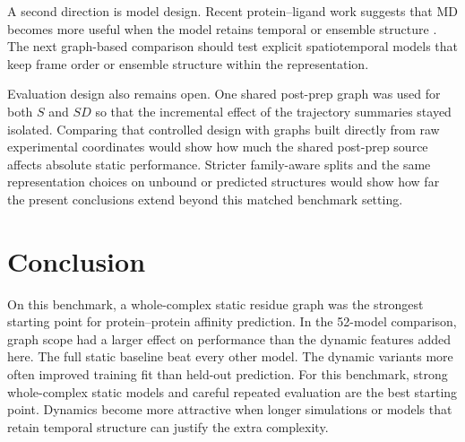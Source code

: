 A second direction is model design. Recent protein--ligand work suggests that MD becomes more useful when the model retains temporal or ensemble structure \citep{Min2024Dynaformer,Libouban2025Spatiotemporal}. The next graph-based comparison should test explicit spatiotemporal models that keep frame order or ensemble structure within the representation.

Evaluation design also remains open. One shared post-prep graph was used for both $S$ and $SD$ so that the incremental effect of the trajectory summaries stayed isolated. Comparing that controlled design with graphs built directly from raw experimental coordinates would show how much the shared post-prep source affects absolute static performance. Stricter family-aware splits and the same representation choices on unbound or predicted structures would show how far the present conclusions extend beyond this matched benchmark setting.

\section{Conclusion}

On this benchmark, a whole-complex static residue graph was the strongest starting point for protein--protein affinity prediction. In the 52-model comparison, graph scope had a larger effect on performance than the dynamic features added here. The full static baseline beat every other model. The dynamic variants more often improved training fit than held-out prediction. For this benchmark, strong whole-complex static models and careful repeated evaluation are the best starting point. Dynamics become more attractive when longer simulations or models that retain temporal structure can justify the extra complexity.
